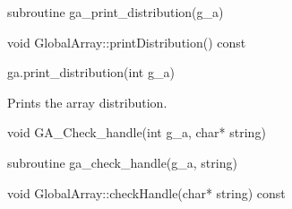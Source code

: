 \documentclass[10pt]{article}
\begin{document}
\begin{fapi}
\begin{fcode}
subroutine ga_print_distribution(g_a)
\end{fcode}
\begin{funcargs}
\end{funcargs}
\end{fapi}

\begin{cxxapi}
\begin{cxxcode}
void GlobalArray::printDistribution() const
\end{cxxcode}
\end{cxxapi}

\begin{pyapi}
\begin{pycode}
ga.print_distribution(int g_a)
\end{pycode}
\begin{funcargs}
\end{funcargs}
\end{pyapi}

\gcoll

\begin{desc}

Prints the array distribution.

\end{desc}


\begin{capi}
\begin{ccode}
void GA_Check_handle(int g_a, char* string)
\end{ccode}
\begin{funcargs}
\end{funcargs}
\end{capi}

\begin{fapi}
\begin{fcode}
subroutine ga_check_handle(g_a, string)
\end{fcode}
\begin{funcargs}
\end{funcargs}
\end{fapi}

\begin{cxxapi}
\begin{cxxcode}
void GlobalArray::checkHandle(char* string) const
\end{cxxcode}
\begin{funcargs}
\end{funcargs}
\end{cxxapi}
\end{document}
